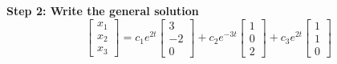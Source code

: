 {    \textbf{Step 2: Write the general solution} \\
    \[
        \begin{bmatrix}
            x_1 \\ x_2 \\ x_3
        \end{bmatrix}
        =
        c_1 e^{2t} \begin{bmatrix}
            3 \\ -2 \\ 0
        \end{bmatrix}
        +
        c_2 e^{-3t} \begin{bmatrix}
            1 \\ 0 \\ 2
        \end{bmatrix}
        +
        c_3 e^{2t} \begin{bmatrix}
            1 \\ 1 \\ 0
        \end{bmatrix}
    \]

}









\newpage